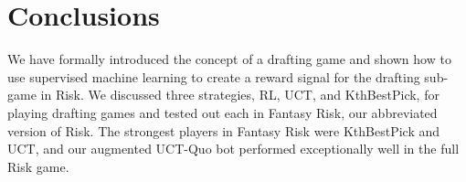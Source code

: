 \documentclass[letterpaper]{article}
\numberwithin{equation}{section}
\numberwithin{theorem}{section}
\numberwithin{lemma}{section}
\numberwithin{df}{section}
\begin{document}


\section{Conclusions}


We have formally introduced the concept of a drafting game and shown how to use supervised machine learning to create a reward signal for the drafting sub-game in Risk.  We discussed three strategies, RL, UCT, and KthBestPick, for playing drafting games and tested out each in Fantasy Risk, our abbreviated version of Risk.  The strongest players in Fantasy Risk were KthBestPick and UCT, and our augmented UCT-Quo bot performed exceptionally well in the full Risk game.

\end{document}
